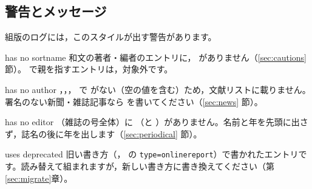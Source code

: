 \subsection{警告とメッセージ}
組版のログには，このスタイルが出す警告があります。

\begin{keymarglist}
\item[has no sortname]
和文の著者・編者のエントリに， がありません（\ref{sec:cautions} 節）。 で親を指すエントリは，対象外です。

\item[has no author]
，，， で  がない（空の値を含む）ため，文献リストに載りません。署名のない新聞・雑誌記事なら  を書いてください（\ref{sec:news} 節）。

\item[has no editor]
（雑誌の号全体）に （と ）がありません。名前と年を先頭に出さず，誌名の後に年を出します（\ref{sec:periodical} 節）。

\item[uses deprecated]
旧い書き方（， の \texttt{type=onlinereport}）で書かれたエントリです。読み替えて組まれますが，新しい書き方に書き換えてください（第\ref{sec:migrate}章）。
\end{keymarglist}
